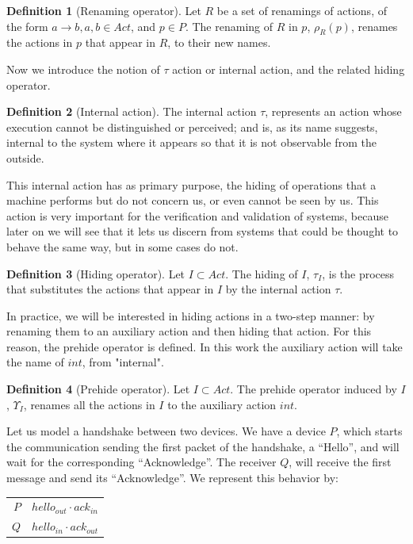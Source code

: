 \documentclass[11pt]{article}
\theoremstyle{definition}
\newtheorem{definition}{Definition}
\theoremstyle{plain}
\begin{document}
\begin{definition} [Renaming operator]
	Let $ R $ be a set of renamings of actions, of the form $ a\rightarrow b, a,b \in Act $, and $ p \in P $. The renaming of $ R $ in $ p $, $ \rho_R(p) $, renames the actions in $ p $ that appear in $ R $, to their new names.
\end{definition}

Now we introduce the notion of $ \tau $ action or internal action, and the related hiding operator.

\begin{definition} [Internal action]
	The internal action $ \tau $, represents an action whose execution cannot be distinguished or perceived; and is, as its name suggests, internal to the system where it appears so that it is not observable from the outside.
\end{definition}
This internal action has as primary purpose, the hiding of operations that a machine performs but do not concern us, or even cannot be seen by us. This action is very important for the verification and validation of systems, because later on we will see that it lets us discern from systems that could be thought to behave the same way, but in some cases do not.
\begin{definition} [Hiding operator]
	Let $ I \subset Act $. The hiding of $ I $, $ \tau_I $, is the process that substitutes the actions that appear in $ I $ by the internal action $ \tau $.
\end{definition}

In practice, we will be interested in hiding actions in a two-step manner: by renaming them to an auxiliary action and then hiding that action. For this reason, the prehide operator is defined. In this work the auxiliary action will take the name of $ int $, from "internal".

\begin{definition} [Prehide operator]
	Let $ I \subset Act $. The prehide operator induced by $ I $, $ \Upsilon_I $, renames all the actions in $ I $ to the auxiliary action $ int $.
\end{definition}

Let us model a handshake between two devices. We have a device $ P $, which starts the communication sending the first packet of the handshake, a ``Hello'', and will wait for the corresponding ``Acknowledge''. The receiver $ Q $, will receive the first message and send its ``Acknowledge''. We represent this behavior by:

\begin{table}[H]
	\centering
	\begin{tabular}{  r@{ = }l  }
		$ P $ & $ hello_{out} \cdot  ack_{in}  $ \\
		$ Q $ & $ hello_{in} \cdot  ack_{out} $
	\end{tabular}
\end{table}
\end{document}

